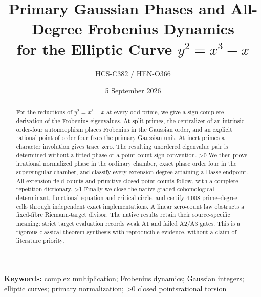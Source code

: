 \documentclass[10pt]{article}
\title{Primary Gaussian Phases and All-Degree Frobenius Dynamics\protect\\
for the Elliptic Curve $y^2=x^3-x$}
\author{HCS-C382 / HEN-O366}
\date{5 September 2026}
\begin{document}
\maketitle
\begin{abstract}
For the reductions of $y^2=x^3-x$ at every odd prime, we give a
sign-complete derivation of the Frobenius eigenvalues. At split primes, the
centralizer of an intrinsic order-four automorphism places Frobenius in
the Gaussian order, and an explicit rational point of order four fixes
the primary Gaussian unit. At inert primes a character involution gives
trace zero. The resulting unordered eigenvalue pair is determined without
a fitted phase or a point-count sign convention.
\ifnum\CRevisionRound>0
We then prove irrational normalized phase in the ordinary chamber,
exact phase order four in the supersingular chamber, and classify every
extension degree attaining a Hasse endpoint. All extension-field counts
and primitive closed-point counts follow, with a complete repetition
dictionary.
\fi
\ifnum\CRevisionRound>1
Finally we close the native graded cohomological determinant, functional
equation and critical circle, and certify 4,008 prime--degree cells through
independent exact implementations. A linear zero-count law obstructs a
fixed-fibre Riemann-target divisor. The native results retain their
source-specific meaning: strict target evaluation records weak A1 and
failed A2/A3 gates. This is a rigorous classical-theorem synthesis with
reproducible evidence, without a claim of literature priority.
\fi
\end{abstract}
\noindent\textbf{Keywords:} complex multiplication; Frobenius dynamics;
Gaussian integers; elliptic curves; primary normalization;
\ifnum\CRevisionRound>0 closed points\else rational torsion\fi
\end{document}
